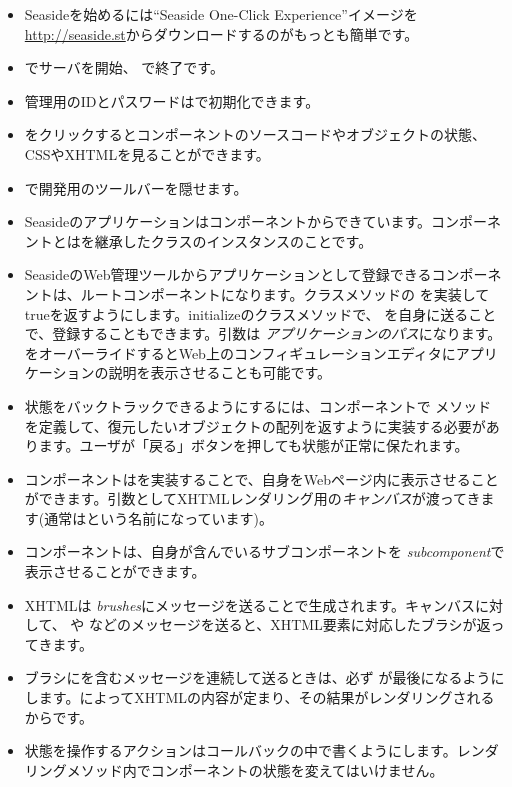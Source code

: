 \documentclass[a4paper,10pt,twoside]{book}
\begin{document}
\begin{itemize}
  \item Seasideを始めるには``Seaside One-Click Experience''イメージを \url{http://seaside.st}からダウンロードするのがもっとも簡単です。
  \item {} でサーバを開始、 で終了です。
  \item 管理用のIDとパスワードはで初期化できます。
  \item {} をクリックするとコンポーネントのソースコードやオブジェクトの状態、CSSやXHTMLを見ることができます。
  \item {} で開発用のツールバーを隠せます。
  \item Seasideのアプリケーションはコンポーネントからできています。コンポーネントとはを継承したクラスのインスタンスのことです。
  \item SeasideのWeb管理ツールからアプリケーションとして登録できるコンポーネントは、ルートコンポーネントになります。クラスメソッドの  を実装してtrueを返すようにします。initializeのクラスメソッドで、  を自身に送ることで、登録することもできます。引数は \emph{アプリケーションのパス}になります。  をオーバーライドするとWeb上のコンフィギュレーションエディタにアプリケーションの説明を表示させることも可能です。
  \item 状態をバックトラックできるようにするには、コンポーネントで  メソッドを定義して、復元したいオブジェクトの配列を返すように実装する必要があります。ユーザが「戻る」ボタンを押しても状態が正常に保たれます。
  \item コンポーネントはを実装することで、自身をWebページ内に表示させることができます。引数としてXHTMLレンダリング用の\emph{キャンバス}が渡ってきます(通常はという名前になっています)。
  \item コンポーネントは、自身が含んでいるサブコンポーネントを  \emph{subcomponent}で表示させることができます。
  \item XHTMLは \emph{brushes}にメッセージを送ることで生成されます。キャンバスに対して、  や などのメッセージを送ると、XHTML要素に対応したブラシが返ってきます。
  \item ブラシにを含むメッセージを連続して送るときは、必ず が最後になるようにします。によってXHTMLの内容が定まり、その結果がレンダリングされるからです。
  \item 状態を操作するアクションはコールバックの中で書くようにします。レンダリングメソッド内でコンポーネントの状態を変えてはいけません。


\end{itemize}
\end{document}
